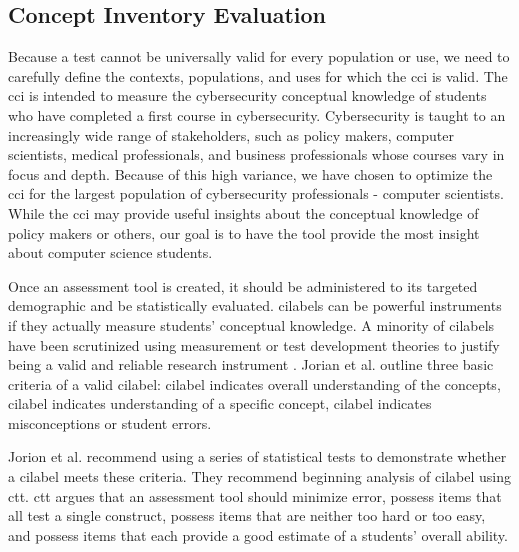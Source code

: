 \subsection{Concept Inventory Evaluation}

Because a test cannot be universally valid for every population or use, we need to carefully define the contexts, populations, and uses for which the \gls{cci} is valid. The \gls{cci} is intended to measure the cybersecurity conceptual knowledge of students who have completed a first course in cybersecurity. Cybersecurity is taught to an increasingly wide range of stakeholders, such as policy makers, computer scientists, medical professionals, and business professionals whose courses vary in focus and depth. Because of this high variance, we have chosen to optimize the \gls{cci} for the largest population of cybersecurity professionals - computer scientists. While the \gls{cci} may provide useful insights about the conceptual knowledge of policy makers or others, our goal is to have the tool provide the most insight about computer science students. 

Once an assessment tool is created, it should be administered to its targeted demographic and be statistically evaluated. \glspl{cilabel} can be powerful instruments if they actually measure students' conceptual knowledge. A minority of \glspl{cilabel} have been scrutinized using measurement or test development theories to justify being a valid and reliable research instrument \cite{dlci}. Jorian et al. \cite{jorian} outline three basic criteria of a valid \gls{cilabel}: \gls{cilabel} indicates overall understanding of the concepts, \gls{cilabel} indicates understanding of a specific concept, \gls{cilabel} indicates misconceptions or student errors.

 Jorion et al. recommend using a series of statistical tests to demonstrate whether a \gls{cilabel} meets these criteria. They recommend beginning analysis of \gls{cilabel} using \gls{ctt}. \gls{ctt} argues that an assessment tool should minimize error, possess items that all test a single construct, possess items that are neither too hard or too easy, and possess items that each provide a good estimate of a students' overall ability. 